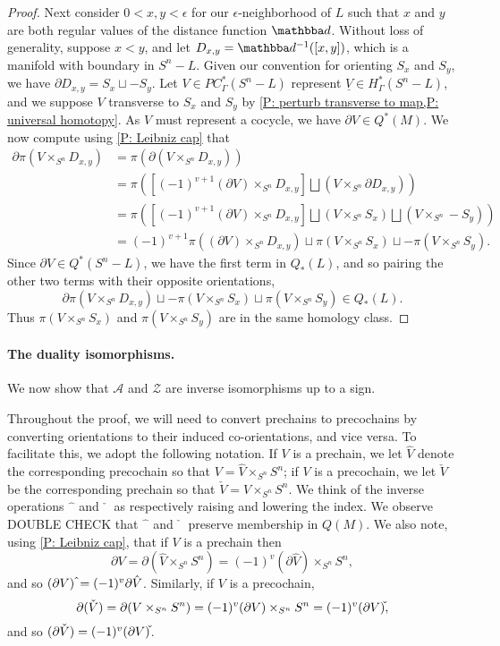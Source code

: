 \documentclass[12pt]{article}
\theoremstyle{plain}
\theoremstyle{definition}
\theoremstyle{remark}
\newcommand{\uV}{\underline{V}}
\newcommand{\bd}{\partial}
\newcommand{\mc}[1]{\mathcal{#1}}
\begin{document}
\begin{proof}
Next consider $0 < x, y < \epsilon$ for our $\epsilon$-neighborhood of $L$ such that $x$ and $y$ are both regular values of the distance function $\mathbba d$.
Without loss of generality, suppose $x < y$, and let $D_{x,y} = \mathbba d^{-1}([x,y])$, which is a manifold with boundary in $S^n-L$.
Given our convention for orienting $S_x$ and $S_y$, we have $\bd D_{x,y} = S_x \sqcup -S_y$.
Let $V \in PC^*_\Gamma(S^n-L)$ represent $\uV \in H^*_\Gamma(S^n - L)$, and we suppose $V$ transverse to $S_x$ and $S_y$ by \cref{P: perturb transverse to map,P: universal homotopy}.
As $V$ must represent a cocycle, we have $\bd V \in Q^*(M)$.
We now compute using \cref{P: Leibniz cap} that
\begin{align*}
\bd \pi(V \times_{S^n} D_{x,y}) &= \pi(\bd (V \times_{S^n} D_{x,y}))\\
&= \pi\left(\left[(-1)^{v+1} (\bd V) \times_{S^n}D_{x,y} \right] \bigsqcup (V \times_{S^n} \bd D_{x,y})\right)\\
&= \pi\left(\left[(-1)^{v+1} (\bd V) \times_{S^n}D_{x,y} \right] \bigsqcup (V \times_{S^n} S_x)\bigsqcup (V \times_{S^n} -S_y)\right)\\
&=(-1)^{v+1} \pi((\bd V) \times_{S^n}D_{x,y}) \sqcup \pi(V \times_{S^n} S_x) \sqcup -\pi(V \times_{S^n} S_y).
\end{align*}
Since $\bd V \in Q^*(S^n-L)$, we have the first term in $Q_*(L)$, and so pairing the other two terms with their opposite orientations,
$$\bd \pi(V \times_{S^n} D_{x,y})\sqcup -\pi(V \times_{S^n} S_x) \sqcup \pi(V \times_{S^n} S_y) \in Q_*(L).$$
Thus $\pi(V \times_{S^n} S_x)$ and $\pi(V \times_{S^n} S_y)$ are in the same homology class.
\end{proof}


\paragraph{The duality isomorphisms.} We now show that $\mc A$ and $\mc Z$ are inverse isomorphisms up to a sign.

Throughout the proof, we will need to convert prechains to precochains by converting orientations to their induced co-orientations, and vice versa.
To facilitate this, we adopt the following notation.
If $V$ is a prechain, we let $\hat V$ denote the corresponding precochain so that $V = \hat V \times_{S^n} S^n$; if $V$ is a precochain, we let $\check V$ be the corresponding prechain so that $\check V = V \times_{S^n} S^n$.
We think of the inverse operations $\hat{\phantom{a}}$ and $\check{\phantom{a}}$ as respectively raising and lowering the index.
We observe DOUBLE CHECK that $\hat{\phantom{a}}$ and $\check{\phantom{a}}$ preserve membership in $Q(M)$.
We also note, using \cref{P: Leibniz cap}, that if $V$ is a prechain then
 $$\bd V = \bd(\hat V \times_{S^n} S^n) = (-1)^{v} (\bd \hat V) \times_{S^n} S^n,$$
and so $(\bd V)\,\hat{\vrule height1.3ex width0pt} = (-1)^{v} \bd \hat V$.
Similarly, if $V$ is a precochain,  $$\bd(\check V) = \bd(V \times_{S^n} S^n) = (-1)^{v} (\bd V) \times_{S^n} S^n = (-1)^v (\bd V)\check{\vrule height1.3ex width0pt},$$
and so $(\bd \check V) = (-1)^{v} (\bd V)\check{\vrule height1.3ex width0pt}$.
\end{document}
